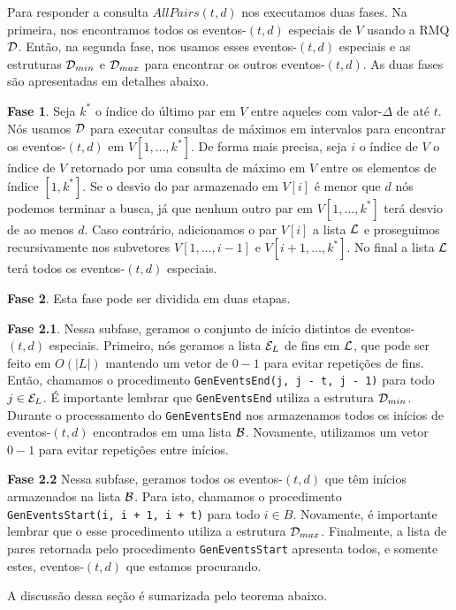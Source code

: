\documentclass[12pt]{article}
\begin{document}
Para responder a consulta $AllPairs(t, d)$ nos executamos duas fases. Na primeira, 
nos encontramos todos os eventos-$(t,d)$ especiais de $V$ usando a RMQ ${\cal D}$.
Então, na segunda fase, nos usamos esses eventos-$(t,d)$ especiais e as estruturas 
${\cal D}_{min}$ e ${\cal D}_{max}$ para encontrar os outros eventos-$(t,d)$. As duas fases
são apresentadas em detalhes abaixo.

\textbf{Fase 1}. Seja $k^*$ o índice do último par em $V$ entre aqueles com valor-$\Delta$
de até $t$. Nós usamos ${\cal D}$ para executar consultas de máximos em intervalos para
encontrar os eventos-$(t,d)$ em $V[1, \ldots, k^*]$. De forma mais precisa, seja $i$ o índice
de $V$ o índice de $V$ retornado por uma consulta de máximo em $V$ entre os elementos de
índice $[1, k^*]$. Se o desvio do par armazenado em $V[i]$ é menor que $d$ nós podemos
terminar a busca, já que nenhum outro par em $V[1, \ldots, k^*]$ terá desvio de ao menos $d$.
Caso contrário, adicionamos o par $V[i]$ a lista ${\cal L}$ e proseguimos recursivamente 
nos subvetores $V[1, \ldots, i - 1]$ e $V[i + 1, \ldots, k^*]$. No final a lista ${\cal L}$ terá
todos os eventos-$(t,d)$ especiais. 

\textbf{Fase 2}. Esta fase pode ser dividida em duas etapas.

\textbf{Fase 2.1}. Nessa subfase, geramos o conjunto de início distintos de eventos-$(t,d)$ especiais.
Primeiro, nós geramos a lista ${\cal E}_L$ de fins em ${\cal L}$, que
pode ser feito em $O(|L|)$ mantendo um vetor de $0-1$ para evitar repetições de fins. Então,
chamamos o procedimento \verb|GenEventsEnd(j, j - t, j - 1)| para todo $j \in {\cal E}_L$. É 
importante lembrar que \verb|GenEventsEnd| utiliza a estrutura ${\cal D}_{min}$. Durante o processamento
do \verb|GenEventsEnd| nos armazenamos todos os inícios de eventos-$(t,d)$ encontrados em uma lista
${\cal B}$. Novamente, utilizamos um vetor $0-1$ para evitar repetições entre inícios.

\textbf{Fase 2.2} Nessa subfase, geramos todos os eventos-$(t,d)$ que têm inícios armazenados
na lista ${\cal B}$. Para isto, chamamos o procedimento \verb|GenEventsStart(i, i + 1, i + t)| para
todo $i \in B$. Novamente, é importante lembrar que o esse procedimento utiliza a estrutura ${\cal D}_{max}$.
Finalmente, a lista de pares retornada pelo procedimento \verb|GenEventsStart| apresenta todos, e somente
estes, eventos-$(t,d)$ que estamos procurando.

A discussão dessa seção é sumarizada pelo teorema abaixo.
\end{document}
